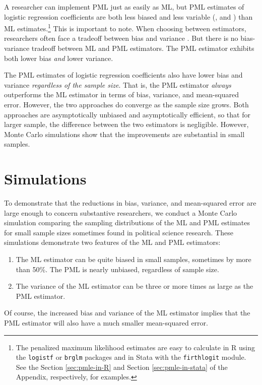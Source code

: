 \documentclass[12pt]{article}
\begin{document}
A researcher can implement PML just as easily as ML, but PML estimates of logistic regression coefficients are both less biased \citep{Firth1993} and less variable (\citealt[p. 49]{Kosmidis2007}, and \citealt{Copas1988}) than ML estimates.\footnote{The penalized maximum likelihood estimates are easy to calculate in R using the \texttt{logistf} or \texttt{brglm} packages and in Stata with the \texttt{firthlogit} module. See the Section \ref{sec:pmle-in-R} and Section \ref{sec:pmle-in-stata} of the Appendix, respectively, for examples.}
This is important to note. 
When choosing between estimators, researchers often face a tradeoff between bias and variance \citep[pp. 37-38]{HastieTibshiraniFriedman2013}.
But there is no bias-variance tradeoff between ML and PML estimators.
The PML estimator exhibits both lower bias \textit{and} lower variance.

The PML estimates of logistic regression coefficients also have lower bias and variance \textit{regardless of the sample size}. That is, the PML estimator \textit{always} outperforms the ML estimator in terms of bias, variance, and mean-squared error. 
However, the two approaches do converge as the sample size grows.
Both approaches are asymptotically unbiased and asymptotically efficient, so that for larger sample, the difference between the two estimators is negligible. 
However, Monte Carlo simulations show that the improvements are substantial in small samples.

\section*{Simulations}

To demonstrate that the reductions in bias, variance, and mean-squared error are large enough to concern substantive researchers, we conduct a Monte Carlo simulation comparing the sampling distributions of the ML and PML estimates for small sample sizes sometimes found in political science research.
These simulations demonstrate two features of the ML and PML estimators:
\begin{enumerate}
\item The ML estimator can be quite biased in small samples, sometimes by more than 50\%. The PML is nearly unbiased, regardless of sample size.
\item The variance of the ML estimator can be three or more times as large as the PML estimator.
\end{enumerate}
Of course, the increased bias and variance of the ML estimator implies that the PML estimator will also have a much smaller mean-squared error.
\end{document}
